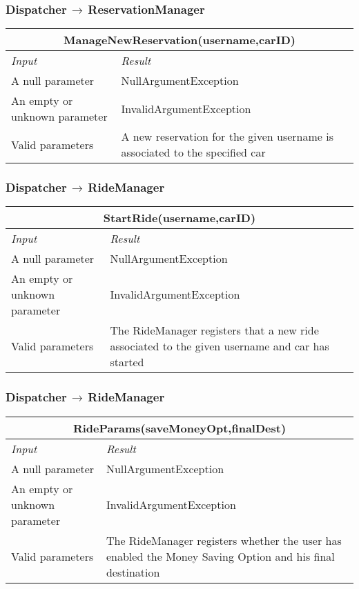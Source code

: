 \documentclass[11pt,a4paper]{report}
\begin{document}
\subsubsection{Dispatcher$\,\to\,$ReservationManager}
\begin{tabularx}{\textwidth}{|X|X|}
	\hline
	\multicolumn{2}{|c|}{\textbf{ManageNewReservation(username,carID)}}\\
	\hline
	\textit{Input} & \textit{Result}\\
	\hline
	A null parameter & NullArgumentException\\
	\hline
	An empty or unknown parameter & InvalidArgumentException\\
	\hline
	Valid parameters & A new reservation for the given username is associated to the specified car\\
	\hline
\end{tabularx}
\subsubsection{Dispatcher$\,\to\,$RideManager}
\begin{tabularx}{\textwidth}{|X|X|}
	\hline
	\multicolumn{2}{|c|}{\textbf{StartRide(username,carID)}}\\
	\hline
	\textit{Input} & \textit{Result}\\
	\hline
	A null parameter & NullArgumentException\\
	\hline
	An empty or unknown parameter & InvalidArgumentException\\
	\hline
	Valid parameters & The RideManager registers that a new ride associated to the given username and car has started\\
	\hline
\end{tabularx}
\subsubsection{Dispatcher$\,\to\,$RideManager}
\begin{tabularx}{\textwidth}{|X|X|}
	\hline
	\multicolumn{2}{|c|}{\textbf{RideParams(saveMoneyOpt,finalDest)}}\\
	\hline
	\textit{Input} & \textit{Result}\\
	\hline
	A null parameter & NullArgumentException\\
	\hline
	An empty or unknown parameter & InvalidArgumentException\\
	\hline
	Valid parameters & The RideManager registers whether the user has enabled the Money Saving Option and his final destination\\
	\hline
\end{tabularx}
\end{document}
